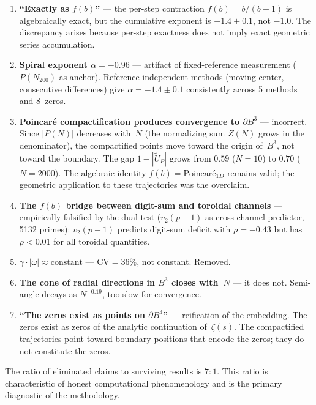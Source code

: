 \documentclass[11pt]{amsart}
\begin{document}
\begin{enumerate}[label=(\alph*)]
\item \textbf{``Exactly as $f(b)$''} --- the per-step contraction
  $f(b) = b/(b+1)$ is algebraically exact, but the cumulative exponent is
  $-1.4 \pm 0.1$, not $-1.0$. The discrepancy arises because per-step
  exactness does not imply exact geometric series accumulation.

\item \textbf{Spiral exponent $\alpha = -0.96$} --- artifact of
  fixed-reference measurement ($P(N_{200})$ as anchor).
  Reference-independent methods (moving center, consecutive differences) give
  $\alpha = -1.4 \pm 0.1$ consistently across 5 methods and 8~zeros.

\item \textbf{Poincar\'e compactification produces convergence to
  $\partial B^3$} --- incorrect. Since $|P(N)|$ decreases with~$N$ (the
  normalizing sum $Z(N)$ grows in the denominator), the compactified points
  move toward the origin of~$B^3$, not toward the boundary. The gap
  $1-|\tilde{U}_P|$ grows from $0.59$ ($N=10$) to $0.70$ ($N=2000$). The
  algebraic identity $f(b) = \text{Poincar\'e}_{1D}$ remains valid; the
  geometric application to these trajectories was the overclaim.

\item \textbf{The $f(b)$ bridge between digit-sum and toroidal channels} ---
  empirically falsified by the dual test ($v_2(p-1)$ as cross-channel
  predictor, 5132 primes): $v_2(p-1)$ predicts digit-sum deficit with
  $\rho = -0.43$ but has $\rho < 0.01$ for all toroidal quantities.

\item \textbf{$\gamma \cdot |\omega| \approx \text{constant}$} ---
  $\text{CV} = 36\%$, not constant. Removed.

\item \textbf{The cone of radial directions in $B^3$ closes with~$N$} ---
  it does not. Semi-angle decays as $N^{-0.19}$, too slow for convergence.

\item \textbf{``The zeros exist as points on $\partial B^3$''} ---
  reification of the embedding. The zeros exist as zeros of the analytic
  continuation of~$\zeta(s)$. The compactified trajectories point toward
  boundary positions that encode the zeros; they do not constitute the zeros.
\end{enumerate}

The ratio of eliminated claims to surviving results is $7{:}1$. This ratio is
characteristic of honest computational phenomenology and is the primary
diagnostic of the methodology.
\end{document}
